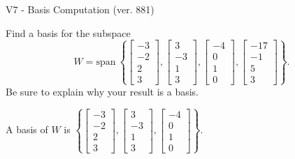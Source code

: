 \begin{exercise}
  \begin{exerciseTitle}V7 - Basis Computation (ver. 881)\end{exerciseTitle}
  \begin{exerciseStatement}
    Find a basis for the subspace 
\[W=\mathrm{span}\ \left\{\left[\begin{array}{r}
-3 \\
-2 \\
2 \\
3
\end{array}\right] , \left[\begin{array}{r}
3 \\
-3 \\
1 \\
3
\end{array}\right] , \left[\begin{array}{r}
-4 \\
0 \\
1 \\
0
\end{array}\right] , \left[\begin{array}{r}
-17 \\
-1 \\
5 \\
3
\end{array}\right]\right\}.\]
 Be sure to explain why your result is a basis.


  \end{exerciseStatement}
  \begin{exerciseAnswer}
   A basis of \(W\) is  \(\left\{\left[\begin{array}{r}
-3 \\
-2 \\
2 \\
3
\end{array}\right] , \left[\begin{array}{r}
3 \\
-3 \\
1 \\
3
\end{array}\right] , \left[\begin{array}{r}
-4 \\
0 \\
1 \\
0
\end{array}\right]\right\}\).
  


  \end{exerciseAnswer}
\end{exercise}